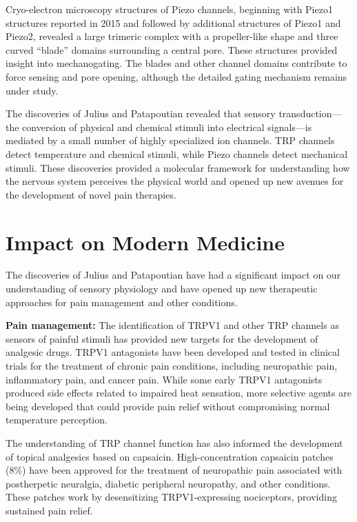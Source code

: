 Cryo-electron microscopy structures of Piezo channels, beginning with Piezo1 structures reported in 2015 and followed by additional structures of Piezo1 and Piezo2, revealed a large trimeric complex with a propeller-like shape and three curved ``blade'' domains surrounding a central pore. These structures provided insight into mechanogating. The blades and other channel domains contribute to force sensing and pore opening, although the detailed gating mechanism remains under study.

The discoveries of Julius and Patapoutian revealed that sensory transduction---the conversion of physical and chemical stimuli into electrical signals---is mediated by a small number of highly specialized ion channels. TRP channels detect temperature and chemical stimuli, while Piezo channels detect mechanical stimuli. These discoveries provided a molecular framework for understanding how the nervous system perceives the physical world and opened up new avenues for the development of novel pain therapies.

\section{Impact on Modern Medicine}

The discoveries of Julius and Patapoutian have had a significant impact on our understanding of sensory physiology and have opened up new therapeutic approaches for pain management and other conditions.

\textbf{Pain management:} The identification of TRPV1 and other TRP channels as sensors of painful stimuli has provided new targets for the development of analgesic drugs. TRPV1 antagonists have been developed and tested in clinical trials for the treatment of chronic pain conditions, including neuropathic pain, inflammatory pain, and cancer pain. While some early TRPV1 antagonists produced side effects related to impaired heat sensation, more selective agents are being developed that could provide pain relief without compromising normal temperature perception.

The understanding of TRP channel function has also informed the development of topical analgesics based on capsaicin. High-concentration capsaicin patches (8\%) have been approved for the treatment of neuropathic pain associated with postherpetic neuralgia, diabetic peripheral neuropathy, and other conditions. These patches work by desensitizing TRPV1-expressing nociceptors, providing sustained pain relief.

